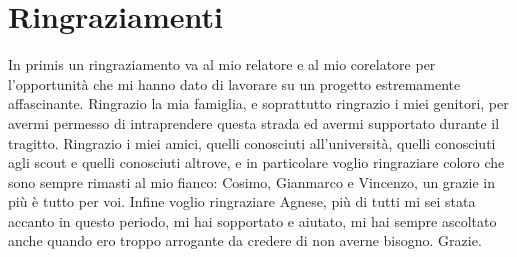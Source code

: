 \chapter*{Ringraziamenti}

In primis un ringraziamento va al mio relatore e al mio corelatore per l'opportunità che mi hanno dato di lavorare su un progetto estremamente affascinante.
Ringrazio la mia famiglia, e soprattutto ringrazio i miei genitori, per avermi permesso di intraprendere questa strada ed avermi supportato durante il tragitto.
Ringrazio i miei amici, quelli conosciuti all'università, quelli conosciuti agli scout e quelli conosciuti altrove, e in particolare voglio ringraziare coloro che sono sempre rimasti al mio fianco: Cosimo, Gianmarco e Vincenzo, un grazie in più è tutto per voi. 
Infine voglio ringraziare Agnese, più di tutti mi sei stata accanto in questo periodo, mi hai sopportato e aiutato,  mi hai sempre ascoltato anche quando ero troppo arrogante da credere di non averne bisogno. Grazie.